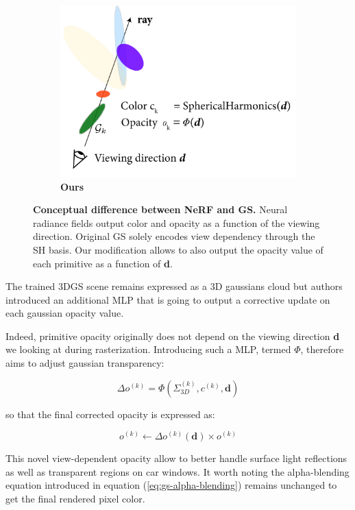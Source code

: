 \begin{figure}[htpb!]
\begin{subfigure}[b]{0.31\linewidth}
    \includegraphics[width=\linewidth]{images/gaussiansplatting/gs.png}
    \caption{\textbf{Ours}}
    \label{fig:gs-ray}
  \end{subfigure}
  \caption{\textbf{Conceptual difference between NeRF and GS.} Neural radiance fields output color and opacity as a function of the viewing direction. Original \ac{GS} solely encodes view dependency through the \ac{SH} basis. Our modification allows to also output the opacity value of each primitive as a function of \textbf{d}.}
  \label{fig:gs-nerf}
\end{figure}

The trained 3D\ac{GS} scene remains expressed as a 3D gaussians cloud but authors introduced an additional \ac{MLP} that is going to output a corrective update on each gaussian opacity value. 

Indeed, primitive opacity originally does not depend on the viewing direction \textbf{d} we looking at during rasterization. Introducing such a \ac{MLP}, termed $\Phi$, therefore aims to adjust gaussian transparency: 

\begin{equation}
\Delta o^{(k)} = \Phi(\Sigma_{3D}^{(k)},c^{(k)},\textbf{d}) 
\end{equation}

so that the final corrected opacity is expressed as: 

\begin{equation}
o^{(k)} \gets \Delta o^{(k)}(\textbf{d}) \times o^{(k)} 
\end{equation}

This novel view-dependent opacity allow to better handle surface light reflections as well as transparent regions on car windows. It worth noting the alpha-blending equation introduced in equation (\ref{eq:gs-alpha-blending}) remains unchanged to get the final rendered pixel color.

